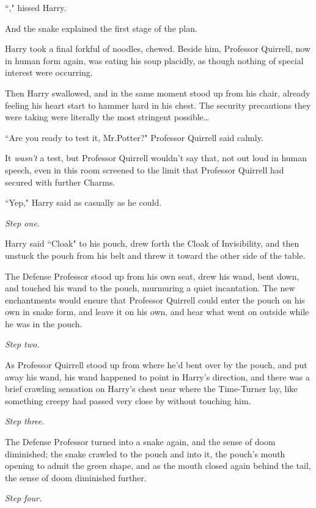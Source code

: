 ``," hissed Harry.

And the snake explained the first stage of the plan.

\later

Harry took a final forkful of noodles, chewed. Beside him, Professor Quirrell, now in human form again, was eating his soup placidly, as though nothing of special interest were occurring.

Then Harry swallowed, and in the same moment stood up from his chair, already feeling his heart start to hammer hard in his chest. The security precautions they were taking were literally the most stringent possible{\ldots}

``Are you ready to test it, Mr.\?Potter?" Professor Quirrell said calmly.

It \emph{wasn't} a test, but Professor Quirrell wouldn't say that, not out loud in human speech, even in this room screened to the limit that Professor Quirrell had secured with further Charms.

``Yep," Harry said as casually as he could.

\emph{Step one.}

Harry said ``Cloak" to his pouch, drew forth the Cloak of Invisibility, and then unstuck the pouch from his belt and threw it toward the other side of the table.

The Defense Professor stood up from his own seat, drew his wand, bent down, and touched his wand to the pouch, murmuring a quiet incantation. The new enchantments would ensure that Professor Quirrell could enter the pouch on his own in snake form, and leave it on his own, and hear what went on outside while he was in the pouch.

\emph{Step two.}

As Professor Quirrell stood up from where he'd bent over by the pouch, and put away his wand, his wand happened to point in Harry's direction, and there was a brief crawling sensation on Harry's chest near where the Time-Turner lay, like something creepy had passed very close by without touching him.

\emph{Step three.}

The Defense Professor turned into a snake again, and the sense of doom diminished; the snake crawled to the pouch and into it, the pouch's mouth opening to admit the green shape, and as the mouth closed again behind the tail, the sense of doom diminished further.

\emph{Step four.}

